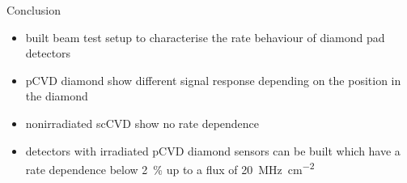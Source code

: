 \begin{frame}{Conclusion}

	\begin{minipage}[c][.5\textheight]{\textwidth}
		\begin{itemize}
			\itemfill
			\item built beam test setup to characterise the rate behaviour of diamond pad detectors
			\item pCVD diamond show different signal response depending on the position in the diamond
			\item nonirradiated scCVD show no rate dependence
			\item detectors with irradiated pCVD diamond sensors can be built which have a rate dependence below \SI{2}{\%} up to a flux of \SI{20}{\mega\hertz\per \centi\meter^2}
		\end{itemize}
	\end{minipage}
	
\end{frame}
